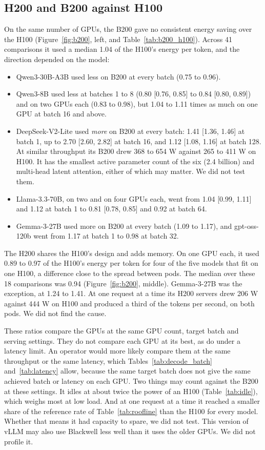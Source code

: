 \documentclass[11pt]{article}
\begin{document}
\subsection{H200 and B200 against H100}\label{sec:b200}

On the same number of GPUs, the B200 gave no consistent energy saving over the H100 (Figure~\ref{fig:b200}, left, and Table~\ref{tab:b200_h100}). Across 41 comparisons it used a median 1.04 of the H100's energy per token, and the direction depended on the model:
\begin{itemize}
\item Qwen3-30B-A3B used less on B200 at every batch (0.75 to 0.96).
\item Qwen3-8B used less at batches 1 to 8 (0.80 [0.76, 0.85] to 0.84 [0.80, 0.89]) and on two GPUs each (0.83 to 0.98), but 1.04 to 1.11 times as much on one GPU at batch 16 and above.
\item DeepSeek-V2-Lite used \emph{more} on B200 at every batch: 1.41 [1.36, 1.46] at batch 1, up to 2.70 [2.60, 2.82] at batch 16, and 1.12 [1.08, 1.16] at batch 128. At similar throughput its B200 drew 368 to 654 W against 265 to 411 W on H100. It has the smallest active parameter count of the six (2.4 billion) and multi-head latent attention, either of which may matter. We did not test them.
\item Llama-3.3-70B, on two and on four GPUs each, went from 1.04 [0.99, 1.11] and 1.12 at batch 1 to 0.81 [0.78, 0.85] and 0.92 at batch 64.
\item Gemma-3-27B used more on B200 at every batch (1.09 to 1.17), and gpt-oss-120b went from 1.17 at batch 1 to 0.98 at batch 32.
\end{itemize}

The H200 shares the H100's design and adds memory. On one GPU each, it used 0.89 to 0.97 of the H100's energy per token for four of the five models that fit on one H100, a difference close to the spread between pods. The median over these 18 comparisons was 0.94 (Figure~\ref{fig:b200}, middle). Gemma-3-27B was the exception, at 1.24 to 1.41. At one request at a time its H200 servers drew 206 W against 444 W on H100 and produced a third of the tokens per second, on both pods. We did not find the cause.

These ratios compare the GPUs at the same GPU count, target batch and serving settings. They do not compare each GPU at its best, as \citet{chung2026joules} do under a latency limit. An operator would more likely compare them at the same throughput or the same latency, which Tables~\ref{tab:decode_batch} and~\ref{tab:latency} allow, because the same target batch does not give the same achieved batch or latency on each GPU. Two things may count against the B200 at these settings. It idles at about twice the power of an H100 (Table~\ref{tab:idle}), which weighs most at low load. And at one request at a time it reached a smaller share of the reference rate of Table~\ref{tab:roofline} than the H100 for every model. Whether that means it had capacity to spare, we did not test. This version of vLLM may also use Blackwell less well than it uses the older GPUs. We did not profile it.
\end{document}
